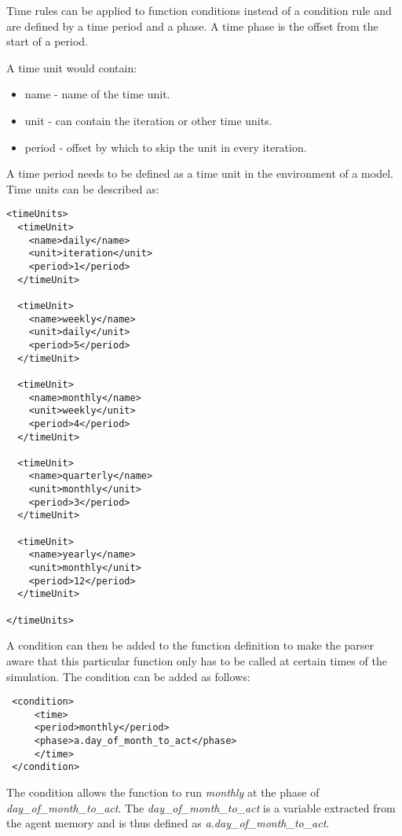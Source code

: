 Time rules can be applied to function conditions instead of a
condition rule and are defined by a time period and a phase. A time
phase is the offset from the start of a period.

A time unit would contain:
\begin{itemize}
\item name - name of the time unit.
\item unit - can contain the iteration or other time units.
\item period - offset by which to skip the unit in every iteration.
\end{itemize}

A time period needs to be defined as a time unit in the environment
of a model. Time units can be described as:

\begin{mylisting}
\begin{verbatim}
<timeUnits>
  <timeUnit>
    <name>daily</name>
    <unit>iteration</unit>
    <period>1</period>
  </timeUnit>

  <timeUnit>
    <name>weekly</name>
    <unit>daily</unit>
    <period>5</period>
  </timeUnit>

  <timeUnit>
    <name>monthly</name>
    <unit>weekly</unit>
    <period>4</period>
  </timeUnit>

  <timeUnit>
    <name>quarterly</name>
    <unit>monthly</unit>
    <period>3</period>
  </timeUnit>

  <timeUnit>
    <name>yearly</name>
    <unit>monthly</unit>
    <period>12</period>
  </timeUnit>

</timeUnits>
\end{verbatim}
\end{mylisting}

A condition can then be added to the function definition to make the
parser aware that this particular function only has to be called at
certain times of the simulation. The condition can be added as
follows:
\begin{mylisting}
\begin{verbatim}
 <condition>
     <time>
     <period>monthly</period>
     <phase>a.day_of_month_to_act</phase>
     </time>
 </condition>
\end{verbatim}
\end{mylisting}

The condition allows the function to run \emph{monthly} at the phase
of \emph{day\_of\_month\_to\_act}. The
\emph{day\_of\_month\_to\_act} is a variable extracted from the
agent memory and is thus defined as
\emph{a.day\_of\_month\_to\_act}.

